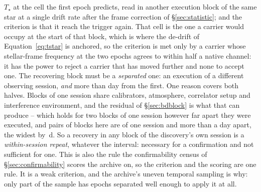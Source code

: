 \begin{enumerate}[label=(\roman*),leftmargin=1.9em,itemsep=3pt,topsep=3pt,parsep=0pt]
$T_\star$ at the cell the first epoch predicts, read in another execution
block of the same star at a single drift rate after the frame correction of
\S\ref{sec:statistic}; and the criterion is that it reach the trigger again.
That cell is the one a carrier would occupy at the start of that block,
which is where the de-drift of Equation~\ref{eq:tstar} is anchored, so the
criterion is met only by a carrier whose stellar-frame frequency at the two
epochs agrees to within half a native channel: it has the power to reject a
carrier that has moved further and none to accept one. The
recovering block must be a \emph{separated} one: an execution of a different
observing session, \emph{and} more than \EpSep{} day from the first. One
reason covers both halves. Blocks of one session share calibrators,
atmosphere, correlator setup and interference environment, and the residual
of \S\ref{sec:bdblock} is what that can produce -- which holds for two blocks
of one session however far apart they were executed, and \QfNPairDrop{} pairs
of blocks here are of one session and more than a day apart, the widest by
\QfSameSessMaxD\,d. So a recovery in any block of the discovery's own session
is a \emph{within-session repeat}, whatever the interval: necessary for a
confirmation and not sufficient for one. This is also the rule the
confirmability census of \S\ref{sec:confirmability} scores the archive on, so
the criterion and the scoring are one rule. It is a weak criterion, and the
archive's uneven temporal sampling is why: only part of the sample has epochs
separated well enough to apply it at all.
\end{enumerate}


